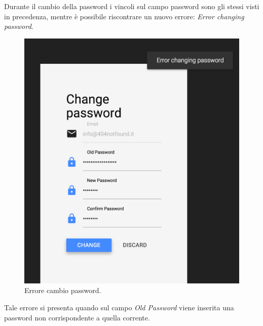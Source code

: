 Durante il cambio della password i vincoli sul campo password sono gli stessi visti in precedenza, mentre è possibile riscontrare un nuovo errore: \emph{Error changing password}.

\begin{figure}[h]
\begin{center}
\includegraphics[scale=0.35]{img/change_pass_error.png}
\caption{Errore cambio password.}
\end{center}
\end{figure}

Tale errore si presenta quando sul campo \emph{Old Password} viene inserita una password non corrispondente a quella corrente.

